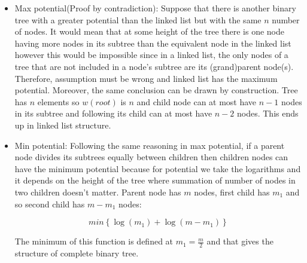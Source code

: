   
  \begin{itemize}
    \item Max potential(Proof by contradiction):
      Suppose that there is another binary tree with a greater potential than the linked list but with the same $n$ number of nodes. It would mean that at some height of the tree there is one node having more nodes in its subtree than the equivalent node in the linked list however this would be impossible since in a linked list, the only nodes of a tree that are not included in a node's subtree are its (grand)parent node(s). Therefore, assumption must be wrong and linked list has the maximum potential. Moreover, the same conclusion can be drawn by construction. Tree has $n$ elements so $w(root)$ is $n$ and child node can at most have $n-1$ nodes in its subtree and following its child can at most have $n-2$ nodes. This ends up in linked list structure.
    \item Min potential:
      Following the same reasoning in max potential, if a parent node divides its subtrees equally between children then children nodes can have the minimum potential because for potential we take the logarithms and it depends on the height of the tree where summation of number of nodes in two children doesn't matter. Parent node has $m$ nodes, first child has $m_1$ and so second child has $m-m_1$ nodes:
      
      $$
        min \left\lbrace \log(m_1) + \log(m-m_1) \right\rbrace
      $$
      
      The minimum of this function is defined at $m_1 = \frac{m}{2}$ and that gives the structure of complete binary tree.
  \end{itemize}